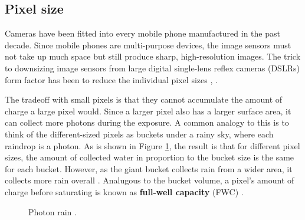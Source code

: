 \subsection{Pixel size}
\label{sec:fwc}

Cameras have been fitted into every mobile phone manufactured in the past decade. Since mobile phones are multi-purpose devices, the image sensors must not take up much space but still produce sharp, high-resolution images. The trick to downsizing image sensors from large digital single-lens reflex cameras (DSLRs) form factor has been to reduce the individual pixel sizes   \cite{xiao2009mobile}, \cite[308-309]{nakamura}.

The tradeoff with small pixels is that they cannot accumulate the amount of charge a large pixel would. Since a larger pixel also has a larger surface area, it can collect more photons during the exposure. A common analogy to this is to think of the different-sized pixels as buckets under a rainy sky, where each raindrop is a photon. As is shown in Figure \ref{fig:photonrain}, the result is that for different pixel sizes, the amount of collected water in proportion to the bucket size is the same for each bucket. However, as the giant bucket collects rain from a wider area, it collects more rain overall  \cite[2.27]{rowlands2020physics}. Analugous to the bucket volume, a pixel's amount of charge before saturating is known as \textbf{full-well capacity} (FWC) \cite[66]{nakamura}.

\begin{figure}
    \centering
    \caption{Photon rain \cite{clarkvision}.}
    \label{fig:photonrain}
\end{figure}

